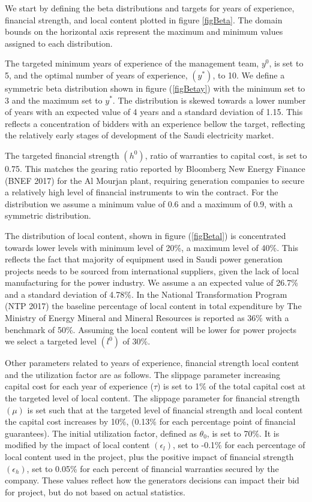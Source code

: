 \documentclass[informs]{informs3}
\begin{document}
We start by defining the beta distributions and targets for years of experience, financial strength, and local content plotted in figure \ref{figBeta}. The domain bounds on the horizontal axis represent the maximum and minimum values assigned to each distribution. 

The targeted minimum years of experience of the management team, $y^{0}$, is set to 5, and the optimal number of years of experience, $(y^{*})$, to 10. We define a symmetric beta distribution shown in figure (\ref{figBetay}) with the minimum set to 3 and the maximum set to $y^*$. The distribution is skewed towards a lower number of years with an expected value of 4 years and a standard deviation of 1.15. This reflects a concentration of bidders with an experience bellow the target, reflecting the relatively early stages of development of the Saudi electricity market.

The targeted financial strength $(h^{0})$, ratio of warranties to capital cost, is set to 0.75. This matches the gearing ratio reported by Bloomberg New Energy Finance (BNEF 2017) for the Al Mourjan plant, requiring generation companies to secure a relatively high level of financial instruments to win the contract. For the distribution we assume a minimum value of 0.6 and a maximum of 0.9, with a symmetric distribution.

The distribution of local content, shown in figure (\ref{figBetal}) is concentrated towards lower levels with minimum level of 20\%, a maximum level of 40\%. This reflects the fact that majority of equipment used in Saudi power generation projects needs to be sourced from international suppliers, given the lack of local manufacturing for the power industry. We assume a an expected value of 26.7\% and a standard deviation of 4.78\%. In the National Transformation Program (NTP 2017) the baseline percentage of local content in total expenditure by The Ministry of Energy Mineral and Mineral Resources is reported as 36\% with a benchmark of 50\%. Assuming the local content will be lower for power projects we select a targeted level $(l^{0})$ of 30\%. 

Other parameters related to years of experience, financial strength local content and the utilization factor are as follows. The slippage parameter increasing capital cost for each year of experience ($\tau$) is  set to  1\% of the total capital cost at the targeted level of local content. The slippage parameter for financial strength $(\mu)$  is set such that at the targeted level of financial strength and local content the capital cost increases by 10\%, (0.13\% for each percentage point of financial guarantees).  The initial utilization factor, defined as $\theta_0$, is set to 70\%. It is modified by the impact of local content $(\epsilon_l)$, set to -0.1\% for each percentage of local content used in the project,  plus the positive  impact of financial strength $(\epsilon_h)$, set to 0.05\% for each percent of financial warranties secured by the company. These values reflect how the generators decisions can impact their bid for project, but do not based on actual statistics.
\end{document}
